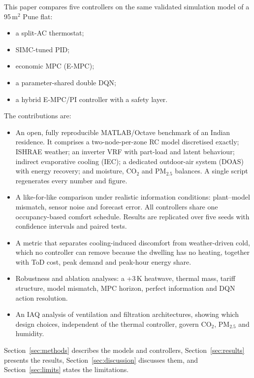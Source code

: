 This paper compares five controllers on the same validated simulation model of a
95\,m$^2$ Pune flat:
\begin{itemize}
  \item a split-AC thermostat;
  \item SIMC-tuned PID;
  \item economic MPC (E-MPC);
  \item a parameter-shared double DQN;
  \item a hybrid E-MPC/PI controller with a safety layer.
\end{itemize}
The contributions are:
\begin{itemize}
  \item An open, fully reproducible MATLAB/Octave benchmark of an Indian residence. It
        comprises a two-node-per-zone RC model discretised exactly; ISHRAE weather; an
        inverter VRF with part-load and latent behaviour; indirect evaporative cooling
        (IEC); a dedicated outdoor-air system (DOAS) with energy recovery; and moisture,
        CO$_2$ and PM$_{2.5}$ balances. A single script regenerates every number and
        figure.
  \item A like-for-like comparison under realistic information conditions:
        plant--model mismatch, sensor noise and forecast error. All controllers share
        one occupancy-based comfort schedule. Results are replicated over five seeds
        with confidence intervals and paired tests.
  \item A metric that separates cooling-induced discomfort from weather-driven cold,
        which no controller can remove because the dwelling has no heating, together
        with ToD cost, peak demand and peak-hour energy share.
  \item Robustness and ablation analyses: a +3\,K heatwave, thermal mass, tariff
        structure, model mismatch, MPC horizon, perfect information and DQN action
        resolution.
  \item An IAQ analysis of ventilation and filtration architectures, showing which
        design choices, independent of the thermal controller, govern CO$_2$, PM$_{2.5}$
        and humidity.
\end{itemize}
Section~\ref{sec:methods} describes the models and controllers,
Section~\ref{sec:results} presents the results, Section~\ref{sec:discussion} discusses
them, and Section~\ref{sec:limits} states the limitations.
